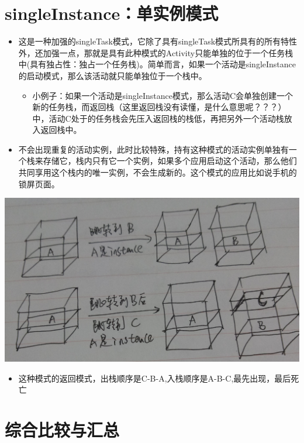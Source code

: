 \documentclass[9pt, b5paaper]{book}
\begin{document}
\section{singleInstance：单实例模式}
\label{sec-4-4}
\begin{itemize}
\item 这是一种加强的singleTask模式，它除了具有singleTask模式所具有的所有特性外，还加强一点，那就是具有此种模式的Activity只能单独的位于一个任务栈中(具有独占性：独占一个任务栈)。简单而言，如果一个活动是singleInstance的启动模式，那么该活动就只能单独位于一个栈中。
\begin{itemize}
\item 小例子：如果一个活动是singleInstance模式，那么活动C会单独创建一个新的任务栈，而返回栈（这里返回栈没有读懂，是什么意思呢？？？）中，活动C处于的任务栈会先压入返回栈的栈低，再把另外一个活动栈放入返回栈中。
\end{itemize}
\item 不会出现重复的活动实例，此时比较特殊，持有这种模式的活动实例单独有一个栈来存储它，栈内只有它一个实例，如果多个应用启动这个活动，那么他们共同享用这个栈内的唯一实例，不会生成新的。这个模式的应用比如说手机的锁屏页面。
\end{itemize}

\includegraphics[width=.9\linewidth]{./pic/singleInstance.jpg}
\begin{itemize}
\item 这种模式的返回模式，出栈顺序是C-B-A,入栈顺序是A-B-C,最先出现，最后死亡
\end{itemize}

\section{综合比较与汇总}
\label{sec-4-5}
\end{document}
